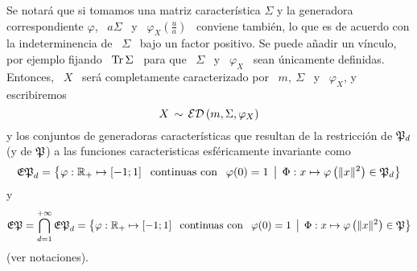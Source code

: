 %
Se notar\'a que si tomamos  una matriz caracter\'istica $\Sigma$ y la generadora
correspondiente  $\varphi$, \  $a  \Sigma$ \  y  \ $\varphi_X\left(  \frac{u}{a}
\right)$ \ conviene tambi\'en, lo que  es de acuerdo con la indeterminencia de \
$\Sigma$ \ bajo un factor positivo.  Se puede a\~nadir un v\'inculo, por ejemplo
fijando  \  $\operatorname{Tr} \Sigma$  \  para  que  \ $\Sigma$  \  y  \ $\varphi_X$  \  sean
\'unicamente definidas. Entonces, \ $X$ \ ser\'a completamente caracterizado por
\ $m, \: \Sigma$ \ y \ $\varphi_X$, y escribiremos
%
\[
X \, \sim \, \mathcal{ED} \left( m , \Sigma , \varphi_X \right)
\]
%
y   los  conjuntos  de   generadoras  caracter\'isticas   que  resultan   de  la
restricci\'on  de   $\mathfrak{P}_d$  (y  de  $\mathfrak{P}$)  a   las  funciones  caracteristicas
esf\'ericamente invariante como
%
\[
\mathfrak{EP}_d = \big\{  \varphi: \mathbb{R}_+ \mapsto [-1 ; 1] \:\:  \mbox{ continuas con }
\:\: \varphi(0)  = 1  \:\: \big| \:\: \Phi: x  \mapsto \varphi\left(  \| x \|^2  \right) \in
\mathfrak{P}_d \big\}
\]
%
y
%
\[
\mathfrak{EP} = \bigcap_{d=1}^{+\infty} \mathfrak{EP}_d =  \big\{ \varphi: \mathbb{R}_+ \mapsto [-1 ;
1]  \:\:  \mbox{ continuas  con  }  \:\: \varphi(0)  =  1  \:\: \big| \:\:  \Phi: x  \mapsto
\varphi\left( \| x \|^2 \right) \in \mathfrak{P} \big\}
\]
%
(ver notaciones).

